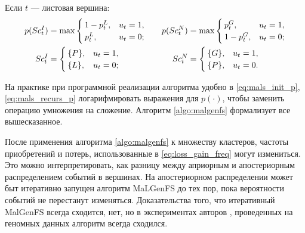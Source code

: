 \documentclass[12pt]{article}
\newenvironment{itemize*}%
{\begin{itemize}%
	\setlength{\itemsep}{0pt}%
	\setlength{\parskip}{0pt}}%
{\end{itemize}}
\begin{document}
\begin{itemize*}
 	\item Если $t$ --- листовая вершина:
 	\begin{equation}
 		\begin{aligned}
			p(Sc_t^I)&=\max\begin{cases}
			1-p_t^L, &u_t=1, \\
			p_t^L, &u_t=0;
			\end{cases}  \quad
			&p(Sc_t^N)&=\max\begin{cases}
			p_t^G, &u_t=1, \\
			1-p_t^G, &u_t=0;
			\end{cases} \\
			Sc_t^I&=\begin{cases}
				\{P\}, &u_t=1, \\
				\{L\}, &u_t=0;
			\end{cases} \quad
			&Sc_t^N&=\begin{cases}
				\{G\}, &u_t=1, \\
				\{P\}, &u_t=0.
			\end{cases}
		\end{aligned} 
		\label{eq:mals_init_p}
 	\end{equation}

 \end{itemize*}

На практике при программной реализации алгоритма удобно в \eqref{eq:mals_init_p}, \eqref{eq:mals_recurs_p} логарифмировать выражения для $p(\cdot)$, чтобы заменить операцию умножения на сложение. Алгоритм \ref{algo:malgenfs} формализует все вышесказанное.

После применения алгоритма  \ref{algo:malgenfs} к множеству кластеров, частоты приобретений и потерь, использованные в  \eqref{eq:loss_gain_freq} могут измениться. Это можно интерпретировать, как разницу между априорным и апостериорным распределением событий в вершинах. На апостериорном распределении может быт итеративно запущен алгоритм MaLGenFS до тех пор, пока вероятности событий не перестанут изменяться. Доказательства того, что итеративный MalGenFS всегда сходится, нет, но в экспериментах авторов \cite{mirkin2006aggregating}, проведенных на геномных данных алгоритм всегда сходился.
\end{document}
